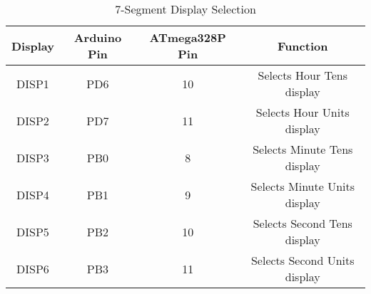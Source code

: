 \begin{table}[h]
    \centering
    \begin{tabular}{|c|c|c|c|}
        \hline
        \textbf{Display} & \textbf{Arduino Pin} & \textbf{ATmega328P Pin} & \textbf{Function} \\
        \hline
        DISP1 & PD6 & 10 & Selects Hour Tens display \\
        DISP2 & PD7 & 11 & Selects Hour Units display \\
        DISP3 & PB0 & 8  & Selects Minute Tens display \\
        DISP4 & PB1 & 9  & Selects Minute Units display \\
        DISP5 & PB2 & 10 & Selects Second Tens display \\
        DISP6 & PB3 & 11 & Selects Second Units display \\
        \hline
    \end{tabular}
    \caption{7-Segment Display Selection}
    \label{tab:display_selection}
\end{table}
